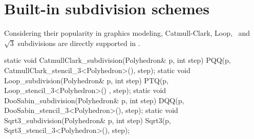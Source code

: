 




\section{Built-in subdivision schemes}
Considering their popularity in graphics modeling, 
Catmull-Clark, Loop, \DS\ and $\sqrt{3}$ subdivisions are directly
supported in . 

\begin{ccExampleCode}
  static void CatmullClark_subdivision(Polyhedron& p, int step) {
    PQQ(p, CatmullClark_stencil_3<Polyhedron>(), step);
  }
  static void Loop_subdivision(Polyhedron& p, int step) {
    PTQ(p, Loop_stencil_3<Polyhedron>() , step);
  }
  static void DooSabin_subdivision(Polyhedron& p, int step) {
    DQQ(p, DooSabin_stencil_3<Polyhedron>(), step);
  }
  static void Sqrt3_subdivision(Polyhedron& p, int step) {
    Sqrt3(p, Sqrt3_stencil_3<Polyhedron>(), step);
  }
\end{ccExampleCode}

